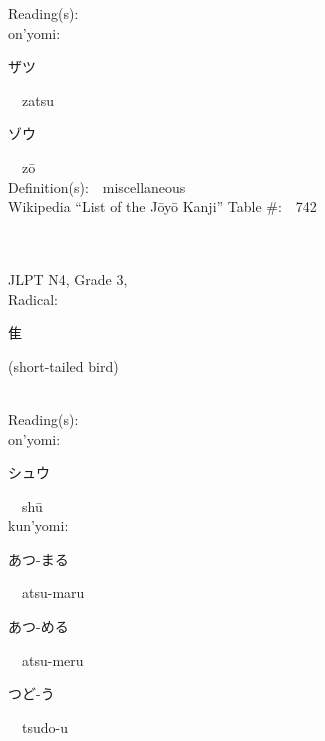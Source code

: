 \begin{multicols}{2}
Reading(s):\ \ \\
{\hspace*{1em}}on'yomi:\ \ \\
{\hspace*{2em}}{\begin{CJK}{UTF8}{min} ザツ \end{CJK}}\ \ zatsu\ \ \\
{\hspace*{2em}}{\begin{CJK}{UTF8}{min} ゾウ \end{CJK}}\ \ z\=o\ \ \\
Definition(s):\ \ miscellaneous \\
Wikipedia ``List of the J\=oy\=o Kanji'' Table \#:\ \ 742 \\
\ \ \\
{\fontsize{34pt}{40pt}  }\ \ \\  %
{JLPT N4, Grade 3, \\Radical:\ \ {\begin{CJK}{UTF8}{min} 隹 \end{CJK}} (short-tailed bird) } \\
Reading(s):\ \ \\
{\hspace*{1em}}on'yomi:\ \ \\
{\hspace*{2em}}{\begin{CJK}{UTF8}{min} シュウ \end{CJK}}\ \ sh\=u\ \ \\
{\hspace*{1em}}kun'yomi:\ \ \\
{\hspace*{2em}}{\begin{CJK}{UTF8}{min} あつ-まる \end{CJK}}\ \ atsu-maru\ \ \\
{\hspace*{2em}}{\begin{CJK}{UTF8}{min} あつ-める \end{CJK}}\ \ atsu-meru\ \ \\
{\hspace*{2em}}{\begin{CJK}{UTF8}{min} つど-う \end{CJK}}\ \ tsudo-u\ \ \\

\end{multicols}
